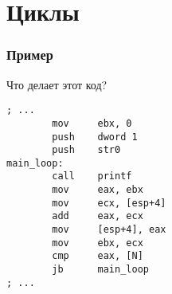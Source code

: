 \documentclass[pdf,9pt,aspectratio=169]{beamer}
\begin{document}
\section{Циклы}

\begin{frame}[fragile]\frametitle{Пример}
  \begin{block}{Что делает этот код?}
    \begin{verbatim}
; ...
        mov     ebx, 0
        push    dword 1
        push    str0
main_loop:
        call    printf
        mov     eax, ebx
        mov     ecx, [esp+4]
        add     eax, ecx
        mov     [esp+4], eax
        mov     ebx, ecx
        cmp     eax, [N]
        jb      main_loop
; ...
    \end{verbatim}
  \end{block}
\end{frame}
\end{document}
